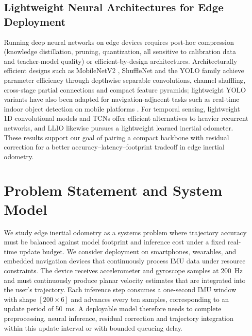 \documentclass[10pt,conference,letterpaper]{IEEEtran}
\begin{document}
\subsection{Lightweight Neural Architectures for Edge Deployment}

Running deep neural networks on edge devices requires post-hoc
compression (knowledge distillation, pruning, quantization, all
sensitive to calibration data and teacher-model quality) or
efficient-by-design architectures. Architecturally efficient designs such as MobileNetV2
\cite{mobilenet2017}, ShuffleNet \cite{shufflenet2018} and the YOLO
family achieve parameter efficiency through depthwise separable
convolutions, channel shuffling, cross-stage partial connections and
compact feature pyramids; lightweight YOLO variants have also been
adapted for navigation-adjacent tasks such as real-time indoor object
detection on mobile platforms \cite{yolonav2026}. For temporal
sensing, lightweight 1D convolutional models and TCNs \cite{ronin2019}
offer efficient alternatives to heavier recurrent networks, and LLIO
\cite{llio2022} likewise pursues a lightweight learned inertial
odometer. These results support our goal of pairing a compact backbone
with residual correction for a better accuracy--latency--footprint
tradeoff in edge inertial odometry.

\section{Problem Statement and System Model}
\label{sec:sysmodel}
We study edge inertial odometry as a systems problem where trajectory accuracy must be balanced against model footprint and inference cost under a fixed real-time update budget. We consider deployment on smartphones, wearables, and embedded navigation devices that continuously process IMU data under resource constraints. The device receives accelerometer and gyroscope samples at 200~Hz and must continuously produce planar velocity estimates that are integrated into the
user's trajectory. Each inference step consumes a one-second IMU window with
shape $[200 \times 6]$ and advances every ten samples, corresponding
to an update period of 50~ms. A deployable model therefore needs to
complete preprocessing, neural inference, residual correction and
trajectory integration within this update interval or with bounded
queueing delay.
\end{document}
